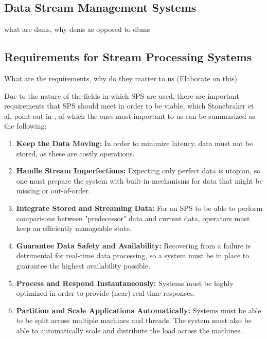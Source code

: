         \subsection{Data Stream Management Systems}
        what are dsms, why dsms as opposed to dbms

        \subsection{Requirements for Stream Processing Systems}
        What are the requirements, why do they matter to us (Elaborate on this)

        Due to the nature of the fields in which SPS are used, there are important requirements that SPS should meet in order to be viable, 
        which Stonebraker et al. point out in \cite{Stonebraker:2005:RRS:1107499.1107504}, of which the ones most important to us can be summarized as the following:
        
        \begin{enumerate}
            \item \textbf{Keep the Data Moving:} 
                In order to minimize latency, data must not be stored, as these are costly operations.
            \item \textbf{Handle Stream Imperfections:} 
                Expecting only perfect data is utopian, so one must prepare the system with built-in mechanisms for data that might be missing or out-of-order.
            \item \textbf{Integrate Stored and Streaming Data:} 
                For an SPS to be able to perform comparisons between "predecessor" data and current data, operators must keep an efficiently manageable state.
            \item \textbf{Guarantee Data Safety and Availability:} 
                Recovering from a failure is detrimental for real-time data processing, so a system must be in place to guarantee the highest availability possible.
            \item \textbf{Process and Respond Instantaneously:} 
                Systems must be highly optimized in order to provide (near) real-time responses.
            \item \textbf{Partition and Scale Applications Automatically:} 
                Systems must be able to be split across multiple machines and threads.
                The system must also be able to automatically scale and distribute the load across the machines.

        \end{enumerate}

